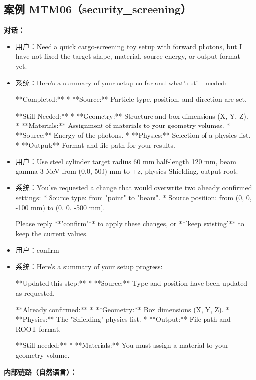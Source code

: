 \documentclass[11pt]{ctexart}
\begin{document}
\subsection{案例 MTM06（security\_screening）}
\textbf{对话：}
\begin{itemize}
\item 用户：Need a quick cargo-screening toy setup with forward photons, but I have not fixed the target shape, material, source energy, or output format yet.
\item 系统：Here's a summary of your setup so far and what's still needed:

**Completed:**
*   **Source:** Particle type, position, and direction are set.

**Still Needed:**
*   **Geometry:** Structure and box dimensions (X, Y, Z).
*   **Materials:** Assignment of materials to your geometry volumes.
*   **Source:** Energy of the photons.
*   **Physics:** Selection of a physics list.
*   **Output:** Format and file path for your results.
\item 用户：Use steel cylinder target radius 60 mm half-length 120 mm, beam gamma 3 MeV from (0,0,-500) mm to +z, physics Shielding, output root.
\item 系统：You've requested a change that would overwrite two already confirmed settings:
*   Source type: from "point" to "beam".
*   Source position: from (0, 0, -100 mm) to (0, 0, -500 mm).

Please reply **'confirm'** to apply these changes, or **'keep existing'** to keep the current values.
\item 用户：confirm
\item 系统：Here's a summary of your setup progress:

**Updated this step:**
*   **Source:** Type and position have been updated as requested.

**Already confirmed:**
*   **Geometry:** Box dimensions (X, Y, Z).
*   **Physics:** The "Shielding" physics list.
*   **Output:** File path and ROOT format.

**Still needed:**
*   **Materials:** You must assign a material to your geometry volume.
\end{itemize}
\textbf{内部链路（自然语言）：}
\end{document}
